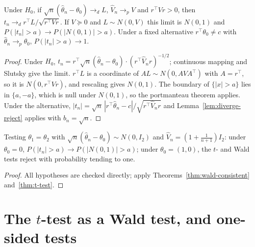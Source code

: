 \begin{theorem}
\label{thm:t-test}
\leanok
{}
Under $H_0$, if $\sqrt n(\hat\theta_n-\theta_0)\to_d L$, $\hat V_n\to_p V$ and $r^\top Vr > 0$, then
$t_n\to_d r^\top L/\sqrt{r^\top Vr}$. If $V\succeq0$ and $L\sim N(0,V)$ this limit is $N(0,1)$ and
$P(|t_n| > a)\to P(|N(0,1)| > a)$. Under a fixed alternative $r^\top\theta_0\ne c$ with $\hat\theta_n\to_p\theta_0$,
$P(|t_n| > a)\to1$.
\end{theorem}
\begin{proof}
\leanok
Under $H_0$, $t_n = r^\top\sqrt n(\hat\theta_n-\theta_0)\cdot(r^\top\hat V_nr)^{-1/2}$; continuous mapping and Slutsky
give the limit. $r^\top L$ is a coordinate of $AL\sim N(0,AVA^\top)$ with $A = r^\top$, so it is $N(0,r^\top Vr)$, and
rescaling gives $N(0,1)$. The boundary of $\{|x| > a\}$ lies in $\{a,-a\}$, which is null under $N(0,1)$, so the
portmanteau theorem applies. Under the alternative, $|t_n| = \sqrt n\,|r^\top\hat\theta_n-c|/\sqrt{r^\top\hat V_nr}$
and Lemma~\ref{lem:diverge-reject} applies with $b_n = \sqrt n$.
\end{proof}

\begin{theorem}[Example]
\label{thm:test-power-witness}
\leanok
{}
Testing $\theta_1 = \theta_2$ with $\sqrt n(\hat\theta_n-\theta_0)\sim N(0,I_2)$ and $\hat V_n = (1+\frac1{n+1})I_2$:
under $\theta_0 = 0$, $P(|t_n| > a)\to P(|N(0,1)| > a)$; under $\theta_0 = (1,0)$, the $t$- and Wald tests reject with
probability tending to one.
\end{theorem}
\begin{proof}
\leanok
All hypotheses are checked directly; apply Theorems~\ref{thm:wald-consistent} and~\ref{thm:t-test}.
\end{proof}

\section{The \texorpdfstring{$t$}{t}-test as a Wald test, and one-sided tests}
\label{sec:one-sided-t}


